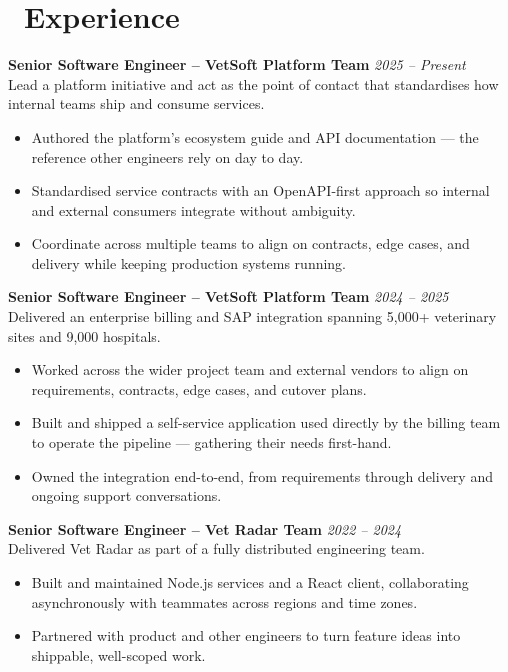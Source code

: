 \documentclass{resume}
\begin{document}
\section{\faUsers\ Experience}
\vspace{1em}
\textbf{Senior Software Engineer – VetSoft Platform Team} \hfill \textit{2025 -- Present} \\
Lead a platform initiative and act as the point of contact that standardises how internal teams ship and consume services.
\begin{itemize}
  \item Authored the platform's ecosystem guide and API documentation — the reference other engineers rely on day to day.
  \item Standardised service contracts with an OpenAPI-first approach so internal and external consumers integrate without ambiguity.
  \item Coordinate across multiple teams to align on contracts, edge cases, and delivery while keeping production systems running.
\end{itemize}

\vspace{1em}

\textbf{Senior Software Engineer – VetSoft Platform Team} \hfill \textit{2024 -- 2025} \\
Delivered an enterprise billing and SAP integration spanning 5,000+ veterinary sites and 9,000 hospitals.
\begin{itemize}
  \item Worked across the wider project team and external vendors to align on requirements, contracts, edge cases, and cutover plans.
  \item Built and shipped a self-service application used directly by the billing team to operate the pipeline — gathering their needs first-hand.
  \item Owned the integration end-to-end, from requirements through delivery and ongoing support conversations.
\end{itemize}

\vspace{1em}

\textbf{Senior Software Engineer – Vet Radar Team} \hfill \textit{2022 -- 2024} \\
Delivered Vet Radar as part of a fully distributed engineering team.
\begin{itemize}
  \item Built and maintained Node.js services and a React client, collaborating asynchronously with teammates across regions and time zones.
  \item Partnered with product and other engineers to turn feature ideas into shippable, well-scoped work.
\end{itemize}
\end{document}
